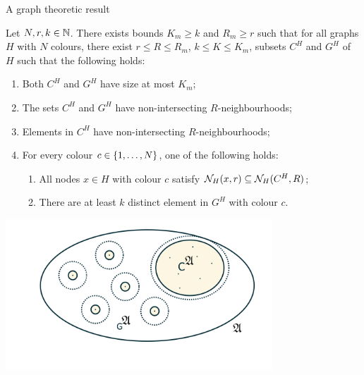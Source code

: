 \documentclass{beamer}
\begin{document}
\begin{frame}{A graph theoretic result}
    \begin{lemma}
        \vspace{0.1em}
        Let $N,r,k \in \mathbb{N}$. There exists bounds
        $K_m \geq k$ and $R_m \geq r$
        such that for all graphs $H$ with $N$ colours,
        there exist $r \leq R \leq R_m$,
        $k \leq K \leq K_m$, subsets $C^H$ and $G^H$
        of $H$ such that the following holds:
        \begin{enumerate}[<+->]
            \item Both $C^H$ and $G^H$ have size at most $K_m$;
            \item The sets $C^H$ and $G^H$ have non-intersecting $R$-neighbourhoods;
            \item Elements in $C^H$ have non-intersecting $R$-neighbourhoods;
            \item For every colour $c \in \{ 1, \dots, N \}$,
                one of the following holds:
                \begin{enumerate}
                    \item All nodes $x \in H$  with colour $c$
                        satisfy $\mathcal{N}_{H}(x, r) \subseteq \mathcal{N}_{H}(C^H, R)$;
                    \item There are at least $k$ distinct element in $G^H$
                        with colour $c$.
                \end{enumerate}
        \end{enumerate}
    \end{lemma}
\end{frame}

\begin{frame}
    \centering
    \includegraphics[width=10cm]{figures/quizz_Page 19.png}
\end{frame}
\end{document}
